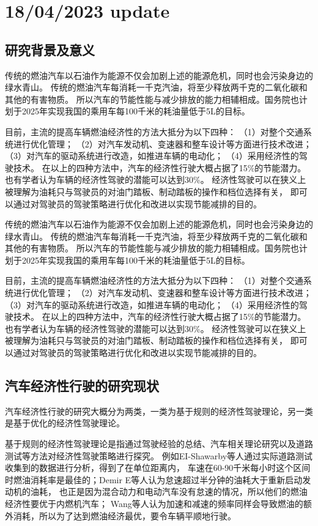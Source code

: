 \chapter{18/04/2023 update}
\section{研究背景及意义}
\par  传统的燃油汽车以石油作为能源不仅会加剧上述的能源危机，同时也会污染身边的绿水青山。
传统的燃油汽车每消耗一千克汽油，将至少释放两千克的二氧化碳和其他的有害物质。
所以汽车的节能性能与减少排放的能力相辅相成。国务院也计划于2025年实现我国的乘用车每100千米的耗油量低于5L的目标。

\par  目前，主流的提高车辆燃油经济性的方法大抵分为以下四种：
    （1）对整个交通系统进行优化管理；
    （2）对汽车发动机、变速器和整车设计等方面进行技术改进；
    （3）对汽车的驱动系统进行改造，如推进车辆的电动化；
    （4）采用经济性的驾驶技术。
在以上的四种方法中，汽车的经济性行驶大概占据了15\%的节能潜力。也有学者认为车辆的经济性驾驶的潜能可以达到30\%。
经济性驾驶可以在狭义上被理解为油耗只与驾驶员的对油门踏板、制动踏板的操作和档位选择有关，
即可以通过对驾驶员的驾驶策略进行优化和改进以实现节能减排的目的。

\par  传统的燃油汽车以石油作为能源不仅会加剧上述的能源危机，同时也会污染身边的绿水青山。
传统的燃油汽车每消耗一千克汽油，将至少释放两千克的二氧化碳和其他的有害物质。
所以汽车的节能性能与减少排放的能力相辅相成。国务院也计划于2025年实现我国的乘用车每100千米的耗油量低于5L的目标。

\par  目前，主流的提高车辆燃油经济性的方法大抵分为以下四种：
    （1）对整个交通系统进行优化管理；
    （2）对汽车发动机、变速器和整车设计等方面进行技术改进；
    （3）对汽车的驱动系统进行改造，如推进车辆的电动化；
    （4）采用经济性的驾驶技术。
在以上的四种方法中，汽车的经济性行驶大概占据了15\%的节能潜力。也有学者认为车辆的经济性驾驶的潜能可以达到30\%。
经济性驾驶可以在狭义上被理解为油耗只与驾驶员的对油门踏板、制动踏板的操作和档位选择有关，
即可以通过对驾驶员的驾驶策略进行优化和改进以实现节能减排的目的。

\section{汽车经济性行驶的研究现状}
\par  汽车经济性行驶的研究大概分为两类，一类为基于规则的经济性驾驶理论，另一类是基于优化的经济性驾驶理论。
\par  基于规则的经济性驾驶理论是指通过驾驶经验的总结、汽车相关理论研究以及道路测试等方法对经济性驾驶策略进行探究。
例如EI-Shawarby等人通过实际道路测试收集到的数据进行分析，得到了在单位距离内，
车速在60-90千米每小时这个区间时燃油消耗率是最佳的；Demir E等人认为怠速超过半分钟的油耗大于重新启动发动机的油耗，
也正是因为混合动力和电动汽车没有怠速的情况，所以他们的燃油经济性要优于内燃机汽车；
Wang等人认为加速和减速的频率同样会导致燃油的额外消耗，所以为了达到燃油经济最优，要令车辆平顺地行驶。

